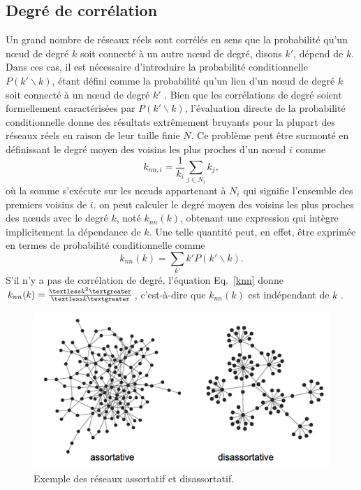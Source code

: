 \subsection{Degré de corrélation} 
Un grand nombre de réseaux réels sont corrélés en sens que la probabilité qu'un nœud de degré $k$ soit connecté à un autre
nœud de degré, disons $k'$, dépend de $k$. Dans ces cas, il est nécessaire d'introduire la probabilité conditionnelle 
$P(k'\backslash k)$, étant défini comme la probabilité qu'un lien d'un nœud de degré $k$ soit connecté à un nœud de degré 
$k'$ \cite{BP2002}. Bien que les corrélations de degré soient formellement caractérisées par $P(k'\backslash k)$, l'évaluation directe de la probabilité conditionnelle donne des résultats extrêmement bruyants pour la plupart des réseaux réels en raison de leur taille finie $N$. Ce problème peut être surmonté en définissant le degré moyen des voisins les plus proches d'un nœud $i$
comme
\begin{equation}
k_{nn,i}=\frac{1}{k_i}\sum_{j\in N_i}k_j,
\end{equation}
où la somme s'exécute sur les nœuds appartenant à $N_i$ qui signifie l'ensemble des premiers voisins de $i$. on peut calculer le degré 
moyen des voisins les plus proches des nœuds avec le degré $k$, noté $k_{nn}(k)$, obtenant une expression qui intègre implicitement
la dépendance de $k$. Une telle quantité peut, en effet, être exprimée en termes de probabilité conditionnelle comme
\begin{equation}
k_{nn}(k)=\sum_{k'}k'P(k'\backslash k).
\label{knn}
\end{equation}
S'il n'y a pas de corrélation de degré, l'équation Eq.~\eqref{knn} donne
$k_{nn}(k)=\frac{\textless k^2\textgreater}{\textless k\textgreater}$, c'est-à-dire que $k_{nn}(k)$ est indépendant de $k$
\cite{Bo-al2006}.\\
\begin{figure}[h!]
	\centering
	\includegraphics[scale=0.6]{./figures/assortative_disassortative}
	\caption{Exemple des réseaux assortatif et disassortatif.}
	\label{assortative_disassortative}
\end{figure}
\label{s-correl}

